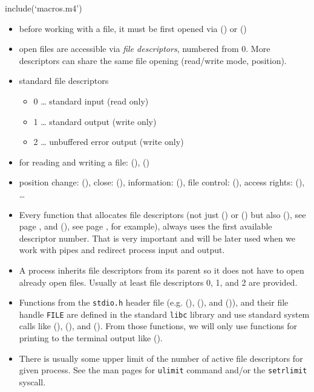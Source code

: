 include(`macros.m4')


\begin{slide}
\begin{itemize}
\item before working with a file, it must be first opened via
() or ()
\item open files are accessible via \emph{file descriptors}, numbered from 0.
More descriptors can share the same file opening (read/write mode, position).
\item standard file descriptors
    \begin{itemize}
    \item 0 \dots{} standard input (read only)
    \item 1 \dots{} standard output (write only)
    \item 2 \dots{} unbuffered error output (write only)
    \end{itemize}
\item for reading and writing a file: (), ()
\item position change: (), close: (),
information: (), file control: (),
access rights: (), \dots
\end{itemize}
\end{slide}

\begin{itemize}
\item Every function that allocates file descriptors (not just () or
() but also (), see page \pageref{PIPEREADWRITE}, and
(), see page \pageref{DUP_CALL}, for example), always uses the first
available descriptor number.  That is very important and will be later used when
we work with pipes and redirect process input and output.
\item A process inherits file descriptors from its parent so it does not have to
open already open files.  Usually at least file descriptors 0, 1, and 2 are
provided.
\item Functions from the \texttt{stdio.h} header file (e.g. (),
(), and ()), and their file handle \texttt{FILE}
are defined in the standard \texttt{libc} library and use standard system calls
like (), (), and ().  From those functions,
we will only use functions for printing to the terminal output like
().
\item There is usually some upper limit of the number of active file descriptors
for given process. See the man pages for \texttt{ulimit} command and/or
the \texttt{setrlimit} syscall.
\end{itemize}

